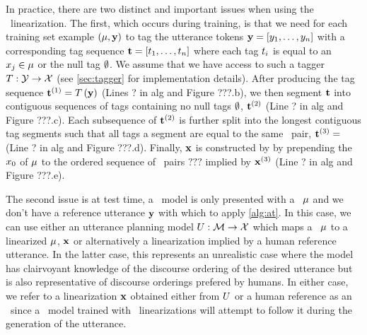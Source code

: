 In practice, there are two distinct and important issues when using the 
\alignmenttraining~linearization. The first, which occurs during training,
is that we need for each training set example $\left(\mu, \mathbf{y}\right)$
to tag the utterance tokens 
$\mathbf{y} = \left[y_1,\ldots,y_n\right]$ 
with a corresponding tag sequence 
$\mathbf{t}=\left[t_1,\ldots, t_n\right]$ where each 
tag $t_i$ is equal to an \attributevalue~$x_j \in \mu$ or 
the null tag $\emptyset$. We assume that we have access to such a tagger
$T : \mathcal{Y} \rightarrow \mathcal{X}$ (see \autoref{sec:tagger}
for implementation details). After producing the tag sequence $\mathbf{t}^{(1)} = T\left(\mathbf{y}\right)$ (Lines ? in alg and Figure ???.b), we then segment $\mathbf{t}$ into contiguous sequences of tags containing no null tags $\emptyset$,
$\mathbf{t}^{(2)}$ (Line ? in alg and Figure ???.c). Each subsequence of $\mathbf{t}^{(2)}$ is further split into the longest contiguous tag segments such that all 
tags a segment are equal to the same \attributevalue~pair, $\mathbf{t}^{(3)} = {}$ (Line ? in alg and Figure ???.d).
Finally, $\mathbf{x}$ is constructed by 
by prepending the \dialogueact~$x_0$ of $\mu$ to the ordered sequence 
of \attributevalue~pairs $???$ implied by $\mathbf{x}^{(3)}$ (Line ? in alg and Figure ???.e). 

The second issue is at test time, a \surfacerealization~model is only
presented with a \meaningrepresentation~$\mu$ and we don't have a reference 
utterance $\mathbf{y}$ with which to apply \autoref{alg:at}. In this case,
we can use either an utterance planning model $U : \mathcal{M} \rightarrow \mathcal{X}$ which maps a \meaningrepresentation~$\mu$ to a
linearized $\mu$, $\mathbf{x}$ or alternatively a linearization implied by 
a human reference utterance. In the latter case, this represents an
unrealistic case where the model has clairvoyant knowledge of the 
discourse ordering of the desired utterance but is also representative
of discourse orderings prefered by humans. In either case, we refer to 
a linearization $\mathbf{x}$ obtained either from $U$ or a human reference
as an \utteranceplan~since a \surfacerealization~model trained with
\alignmenttraining~linearizations will attempt to follow it during 
the generation of the utterance.





